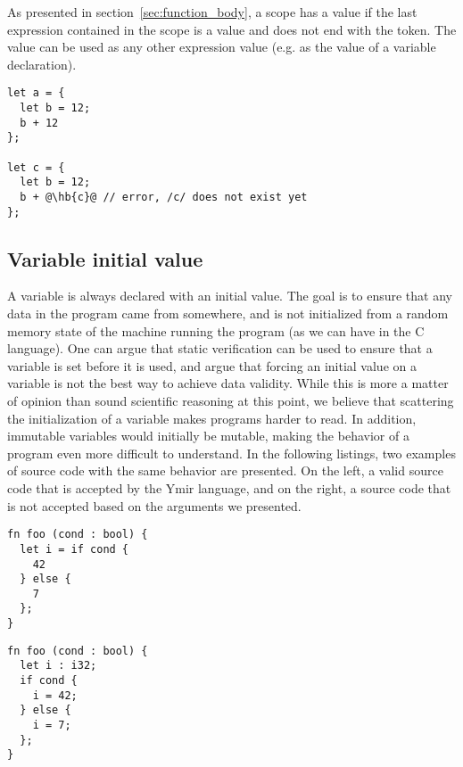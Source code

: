 As presented in section~\ref{sec:function_body}, a scope has a value if the last
expression contained in the scope is a value and does not end with the
\token{;} token. The value can be used as any other expression value (e.g. as
the value of a variable declaration).

\begin{lstlisting}[style=coloredverbatim, escapechar=@]
let a = {
  let b = 12;
  b + 12
};

let c = {
  let b = 12;
  b + @\hb{c}@ // error, /c/ does not exist yet
};
\end{lstlisting}

\subsection{Variable initial value}

A variable is always declared with an initial value. The goal is to ensure that
any data in the program came from somewhere, and is not initialized from a
random memory state of the machine running the program (as we can have in the C
language). One can argue that static verification can be used to ensure that a
variable is set before it is used, and argue that forcing an initial value on a
variable is not the best way to achieve data validity. While this is more a
matter of opinion than sound scientific reasoning at this point, we believe that
scattering the initialization of a variable makes programs harder to read. In
addition, immutable variables would initially be mutable, making the behavior of
a program even more difficult to understand. In the following listings, two
examples of source code with the same behavior are presented. On the left, a
valid source code that is accepted by the Ymir language, and on the right, a
source code that is not accepted based on the arguments we presented.

\hspace{-15pt}%
\begin{minipage}[t][][t]{0.47\linewidth}
  \begin{lstlisting}[style=coloredverbatim, escapechar=@, caption=Valid]
fn foo (cond : bool) {
  let i = if cond {
    42
  } else {
    7
  };
}
  \end{lstlisting}
\end{minipage}\hspace{10pt}%
\begin{minipage}[t][][t]{0.47\linewidth}
  \begin{lstlisting}[style=coloredverbatim, escapechar=@, caption=Invalid]
fn foo (cond : bool) {
  let i : i32;
  if cond {
    i = 42;
  } else {
    i = 7;
  };
}
  \end{lstlisting}
\end{minipage}


